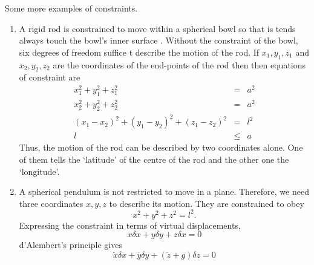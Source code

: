 Some more examples of constraints.
\begin{enumerate}
\item A rigid rod is constrained to move within a spherical bowl so that
is tends always touch the bowl's inner surface \cite[Problem 3, chapter 2]
{akr}. Without the constraint of the bowl, six degrees of freedom suffice t
describe the motion of the rod.  If $x_1, y_1, z_1$ and $x_2, y_2, z_2$ are
the coordinates of the end-points of the rod then then equations of
constraint are
\begin{eqnarray}
x_1^2 + y_1^2 + z_1^2 &=& a^2 \\
x_2^2 + y_2^2 + z_2^2 &=& a^2 \\
(x_1 - x_2)^2 + (y_1 - y_2)^2 + (z_1 - z_2)^2 &=& l^2 \\
l &\le& a
\end{eqnarray}
Thus, the motion of the rod can be described by two coordinates alone. One 
of them tells the `latitude' of the centre of the rod and the other one the
`longitude'.

\item A spherical pendulum is not restricted to move in a plane. Therefore,
we need three coordinates $x, y, z$ to describe its motion. They are
constrained to obey
\begin{equation}\label{c1s2e37}
x^2 + y^2 + z^2 = l^2.
\end{equation}
Expressing the constraint in terms of virtual displacements,
\begin{equation}\label{c1s2e38}
x\delta{x} + y\delta{y} + z\delta{x} = 0
\end{equation}
d'Alembert's principle gives
\begin{equation}\label{c1s2e39}
\ddot{x}\delta{x} + \ddot{y}\delta{y} + (\ddot{z} + g)\delta{z} = 0
\end{equation}
\end{enumerate}

